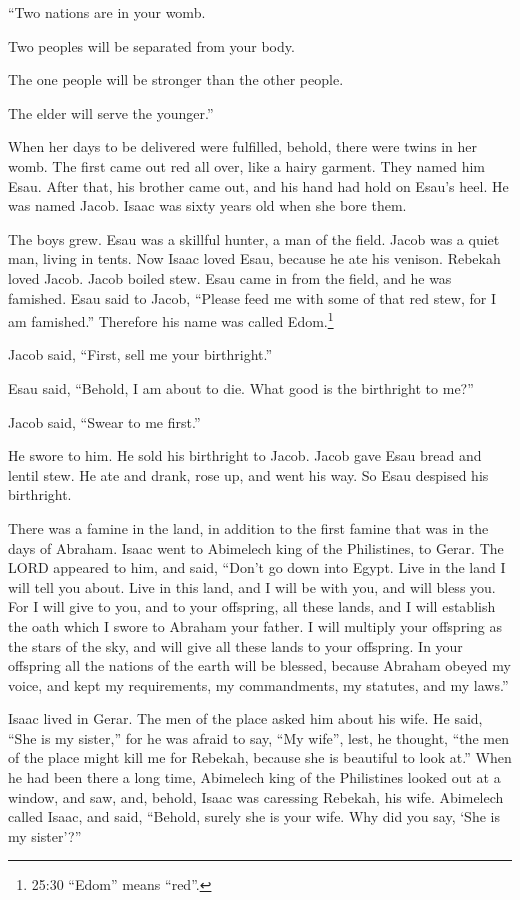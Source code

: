 “Two nations are in your womb.

Two peoples will be separated from your body.

The one people will be stronger than the other people.

The elder will serve the younger.”

\myverse{}When her days to be delivered were fulfilled, behold, there were twins in her womb. \myverse{}The first came out red all over, like a hairy garment. They named him Esau. \myverse{}After that, his brother came out, and his hand had hold on Esau’s heel. He was named Jacob. Isaac was sixty years old when she bore them.

\myverse{}The boys grew. Esau was a skillful hunter, a man of the field. Jacob was a quiet man, living in tents. \myverse{}Now Isaac loved Esau, because he ate his venison. Rebekah loved Jacob. \myverse{}Jacob boiled stew. Esau came in from the field, and he was famished. \myverse{}Esau said to Jacob, “Please feed me with some of that red stew, for I am famished.” Therefore his name was called Edom.\footnote{25:30 “Edom” means “red”.}

\myverse{}Jacob said, “First, sell me your birthright.”

\myverse{}Esau said, “Behold, I am about to die. What good is the birthright to me?”

\myverse{}Jacob said, “Swear to me first.”

He swore to him. He sold his birthright to Jacob. \myverse{}Jacob gave Esau bread and lentil stew. He ate and drank, rose up, and went his way. So Esau despised his birthright.


\mychapter{}
\myverse*{}There was a famine in the land, in addition to the first famine that was in the days of Abraham. Isaac went to Abimelech king of the Philistines, to Gerar. \myverse{}The LORD appeared to him, and said, “Don’t go down into Egypt. Live in the land I will tell you about. \myverse{}Live in this land, and I will be with you, and will bless you. For I will give to you, and to your offspring, all these lands, and I will establish the oath which I swore to Abraham your father. \myverse{}I will multiply your offspring as the stars of the sky, and will give all these lands to your offspring. In your offspring all the nations of the earth will be blessed, \myverse{}because Abraham obeyed my voice, and kept my requirements, my commandments, my statutes, and my laws.”

\myverse{}Isaac lived in Gerar. \myverse{}The men of the place asked him about his wife. He said, “She is my sister,” for he was afraid to say, “My wife”, lest, he thought, “the men of the place might kill me for Rebekah, because she is beautiful to look at.” \myverse{}When he had been there a long time, Abimelech king of the Philistines looked out at a window, and saw, and, behold, Isaac was caressing Rebekah, his wife. \myverse{}Abimelech called Isaac, and said, “Behold, surely she is your wife. Why did you say, ‘She is my sister’?”

